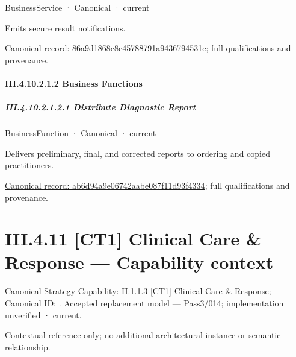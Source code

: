 \label{element:86a9d1868c8c45788791a9436794531c}
{\small BusinessService · Canonical · current}\par

Emits secure result notifications.


{\footnotesize \href{../../../../../../../../continuum/business/business-service/86a9d1868c8c45788791a9436794531c.md}{Canonical record: 86a9d1868c8c45788791a9436794531c}; full qualifications and provenance.}\par
\paragraph*{III.4.10.2.1.2 Business Functions}
\label{navigation:III.4.10.2.1.2}

\subparagraph*{III.4.10.2.1.2.1 Distribute Diagnostic Report}
\label{navigation:III.4.10.2.1.2.1}

\label{element:ab6d94a9e06742aabe087f11d93f4334}
{\small BusinessFunction · Canonical · current}\par

Delivers preliminary, final, and corrected reports to ordering and copied practitioners.


{\footnotesize \href{../../../../../../../../continuum/business/business-function/ab6d94a9e06742aabe087f11d93f4334.md}{Canonical record: ab6d94a9e06742aabe087f11d93f4334}; full qualifications and provenance.}\par
\section*{III.4.11 [CT1] Clinical Care \& Response — Capability context}
\label{navigation:III.4.11}

{\small Canonical Strategy Capability: II.1.1.3 \hyperref[element:0962afc8439c4e1898a7e2ae3f4186a4]{[CT1] Clinical Care \& Response}; Canonical ID: \texttt{}. Accepted replacement model — Pass3/014; implementation unverified · current.}\par
Contextual reference only; no additional architectural instance or semantic relationship.\par
